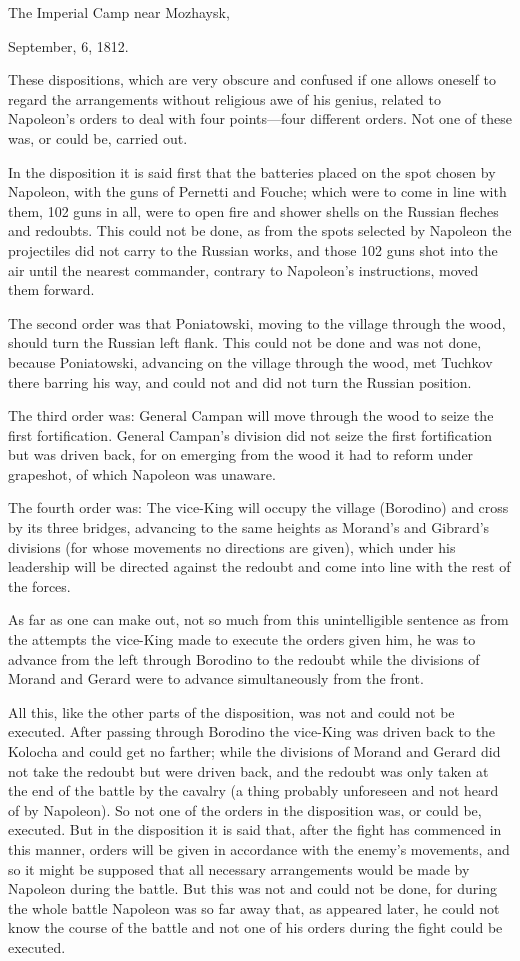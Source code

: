 The Imperial Camp near Mozhaysk,

September, 6, 1812.

These dispositions, which are very obscure and confused if one
allows oneself to regard the arrangements without religious awe
of his genius, related to Napoleon's orders to deal with four
points---four different orders. Not one of these was, or could
be, carried out.

In the disposition it is said first that the batteries placed on
the spot chosen by Napoleon, with the guns of Pernetti and
Fouche; which were to come in line with them, 102 guns in all,
were to open fire and shower shells on the Russian fleches and
redoubts. This could not be done, as from the spots selected by
Napoleon the projectiles did not carry to the Russian works, and
those 102 guns shot into the air until the nearest commander,
contrary to Napoleon's instructions, moved them forward.

The second order was that Poniatowski, moving to the village
through the wood, should turn the Russian left flank. This could
not be done and was not done, because Poniatowski, advancing on
the village through the wood, met Tuchkov there barring his way,
and could not and did not turn the Russian position.

The third order was: General Campan will move through the wood to
seize the first fortification. General Campan's division did not
seize the first fortification but was driven back, for on
emerging from the wood it had to reform under grapeshot, of which
Napoleon was unaware.

The fourth order was: The vice-King will occupy the village
(Borodino) and cross by its three bridges, advancing to the same
heights as Morand's and Gibrard's divisions (for whose movements
no directions are given), which under his leadership will be
directed against the redoubt and come into line with the rest of
the forces.

As far as one can make out, not so much from this unintelligible
sentence as from the attempts the vice-King made to execute the
orders given him, he was to advance from the left through
Borodino to the redoubt while the divisions of Morand and Gerard
were to advance simultaneously from the front.

All this, like the other parts of the disposition, was not and
could not be executed. After passing through Borodino the
vice-King was driven back to the Kolocha and could get no
farther; while the divisions of Morand and Gerard did not take
the redoubt but were driven back, and the redoubt was only taken
at the end of the battle by the cavalry (a thing probably
unforeseen and not heard of by Napoleon). So not one of the
orders in the disposition was, or could be, executed. But in the
disposition it is said that, after the fight has commenced in
this manner, orders will be given in accordance with the enemy's
movements, and so it might be supposed that all necessary
arrangements would be made by Napoleon during the battle. But
this was not and could not be done, for during the whole battle
Napoleon was so far away that, as appeared later, he could not
know the course of the battle and not one of his orders during
the fight could be executed.

